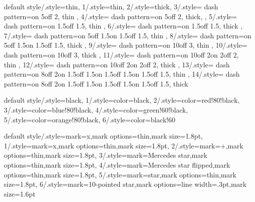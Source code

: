 {
  default style/.style=thin,
  1/.style=thin,
  2/.style=thick,
  3/.style={
    dash pattern=on 5\pgflinewidth off 2\pgflinewidth,
    thin
  },
  4/.style={
    dash pattern=on 5\pgflinewidth off 2\pgflinewidth,
    thick,
  },
  5/.style={
    dash pattern=on 1.5\pgflinewidth off 1.5\pgflinewidth,
    thin
  },
  6/.style={
    dash pattern=on 1.5\pgflinewidth off 1.5\pgflinewidth,
    thick
  },
  7/.style={
    dash pattern=on 5\pgflinewidth off 1.5\pgflinewidth on
    1.5\pgflinewidth off 1.5\pgflinewidth,
    thin
  },
  8/.style={
    dash pattern=on 5\pgflinewidth off 1.5\pgflinewidth on
    1.5\pgflinewidth off 1.5\pgflinewidth,
    thick
  },
  9/.style={
    dash pattern=on 10\pgflinewidth off 3\pgflinewidth,
    thin
  },
  10/.style={
    dash pattern=on 10\pgflinewidth off 3\pgflinewidth,
    thick
  },
  11/.style={
    dash pattern=on 10\pgflinewidth off 2\pgflinewidth on
    2\pgflinewidth off 2\pgflinewidth,
    thin
  },
  12/.style={
    dash pattern=on 10\pgflinewidth off 2\pgflinewidth on
    2\pgflinewidth off 2\pgflinewidth,
    thick
  },
  13/.style={
    dash pattern=on 8\pgflinewidth off 2\pgflinewidth on
    1.5\pgflinewidth off 1.5\pgflinewidth on 1.5\pgflinewidth off
    1.5\pgflinewidth on 1.5\pgflinewidth off 1.5\pgflinewidth,
    thin
  },
  14/.style={
    dash pattern=on 8\pgflinewidth off 2\pgflinewidth on
    1.5\pgflinewidth off 1.5\pgflinewidth on 1.5\pgflinewidth off
    1.5\pgflinewidth on 1.5\pgflinewidth off 1.5\pgflinewidth,
    thick
  }  
}


{
  default style/.style={black},
  1/.style={color=black},
  2/.style={color=red!80!black},
  3/.style={color=blue!80!black},
  4/.style={color=green!60!black},
  5/.style={color=orange!80!black},
  6/.style={color=black!60}
}


{
  default style/.style={mark=x,mark options=thin,mark size=1.8pt},
  1/.style={mark=x,mark options=thin,mark size=1.8pt},
  2/.style={mark=+,mark options=thin,mark size=1.8pt},
  3/.style={mark=Mercedes star,mark options=thin,mark size=1.8pt},
  4/.style={mark=Mercedes star flipped,mark options=thin,mark size=1.8pt},
  5/.style={mark=star,mark options=thin,mark size=1.8pt},
  6/.style={mark=10-pointed star,mark options={line width=.3pt,mark size=1.6pt}}
}



% 
% 
% 

